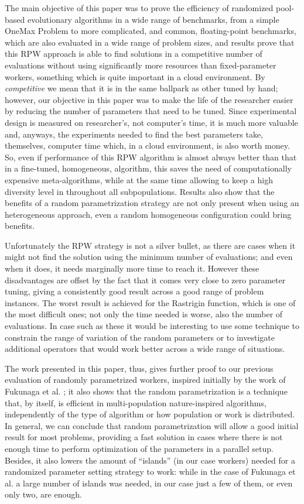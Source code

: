\documentclass[conference]{IEEEtran}
\begin{document}
The main objective of this paper was to prove the efficiency of
randomized pool-based evolutionary algorithms in a wide range of
benchmarks, from a simple OneMax Problem to more complicated, and
common, floating-point benchmarks, which are also evaluated in a wide
range of problem sizes, and results prove that this RPW approach is
able to find solutions in a competitive number of evaluations without
using significantly more resources than fixed-parameter workers,
something which is quite important in a cloud environment. By {\em
competitive} we mean that it is in the same ballpark as other tuned by
hand; however, our objective in this paper was to make the life of the
researcher easier by reducing the number of parameters that need to be
tuned. Since experimental design is measured on researcher's, not
computer's time, it is much more valuable and, anyways, the
experiments needed to find the best parameters take, themselves,
computer time which, in a cloud environment, is also worth money. So,
even if performance of this RPW algorithm is almost always better than
that in a fine-tuned, homogeneous, algorithm, this saves the need of
computationally expensive meta-algorithms, while at the same time
allowing to keep a high diversity level in throughout all
subpopulations.  Results also show that the benefits of a random
parametrization strategy are not only present when using an
heterogeneous approach, even a random homogeneous configuration could
bring benefits.

Unfortunately the RPW strategy is not a silver bullet, as there are cases
when it might not find the solution using the minimum number of
evaluations; and even when it does, it needs marginally more time to
reach it. However these disadvantages are
offset by the fact that it comes very close to zero parameter tuning,
giving a consistently good result across a good range of problem instances.
The worst result is achieved for the Rastrigin function, which
is one of the most difficult ones; not only the time needed is worse,
also the number of evaluations. In case such as these it would be
interesting to use some technique to constrain the range of variation
of the random parameters or to investigate additional operators that
would work better across a wide range of situations.

The work presented in this paper, thus, gives further proof to our
previous evaluation of randomly parametrized workers, inspired
initially by the work of Fukunaga et al. \cite{fuku1}; it also shows that the random
parametrization is a technique that, by itself, is efficient in
multi-population nature-inspired algorithms, independently of the type
of algorithm or how population or work is distributed. In general, we
can conclude that 
random parametrization will allow a good initial result for most
problems, providing a fast solution in cases where there is not enough
time to perform optimization of the parameters in a parallel
setup. Besides, it also lowers the amount of ``islands'' (in our case
workers) needed for a randomized parameter setting strategy to work:
while in the case of Fukunaga et al. \cite{fuku1} a large number of islands was
needed, in our case just a few of them, or even only two, are
enough.
\end{document}
